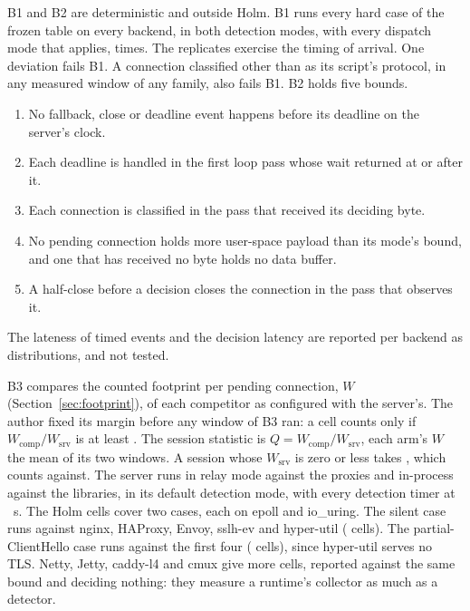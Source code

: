  B1 and B2 are deterministic and outside Holm. B1 runs every hard case of
the frozen table on every backend, in both detection modes, with every dispatch mode that
applies, \CaseReps{} times. The replicates exercise the timing of arrival. One deviation fails
B1. A connection classified other than as its script's protocol, in any measured window of any
family, also fails B1. B2 holds five bounds.
\begin{enumerate}[label=(\alph*)]
\item No fallback, close or deadline event happens before its deadline on the server's clock.
\item Each deadline is handled in the first loop pass whose wait returned at or after it.
\item Each connection is classified in the pass that received its deciding byte.
\item No pending connection holds more user-space payload than its mode's bound, and one that has
received no byte holds no data buffer.
\item A half-close before a decision closes the connection in the pass that observes it.
\end{enumerate}
The lateness of timed events and the decision
latency are reported per backend as distributions, and not tested.

B3 compares the counted footprint per pending connection, $W$ (Section~\ref{sec:footprint}), of
each competitor as configured with the server's. The author fixed its margin before any window
of B3 ran: a cell counts only if $W_{\mathrm{comp}}/W_{\mathrm{srv}}$ is at least
\FootprintMargin. The session statistic is $Q = W_{\mathrm{comp}}/W_{\mathrm{srv}}$, each arm's $W$
the mean of its two windows. A session whose $W_{\mathrm{srv}}$ is zero or less takes \Qzero,
which counts against. The server runs in relay mode against the proxies and in-process against
the libraries, in its default detection mode, with every detection timer at \PendTimerS{}~s. The
\FamilyBCells{} Holm cells cover two cases, each on epoll and io\_uring. The silent case runs
against nginx, HAProxy, Envoy, sslh-ev and hyper-util (\SilentHolmCells{} cells). The
partial-ClientHello case runs against the first four (\PartialHolmCells{} cells), since hyper-util
serves no TLS. Netty, Jetty,
caddy-l4 and cmux give \FamilyBDescriptive{} more cells, reported against the same bound and
deciding nothing: they measure a runtime's collector as much as a detector.

